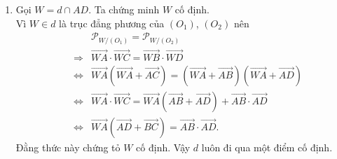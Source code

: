 \begin{bt}
{\begin{enumerate}
			Dễ thấy $P_1Q_1\parallel P_2Q_2$, do đó $\overrightarrow{P_1Q_1}=k\overrightarrow{P_2Q_2}$, $k\neq 0$. Mặt khác
			$$2\overrightarrow{XY}=\left(\overrightarrow{XP_2}+\overrightarrow{P_2Q_2}+\overrightarrow{Q_2Y}\right)+\left(\overrightarrow{XQ_1}+\overrightarrow{Q_1P_1}+\overrightarrow{P_1Y}\right)=\overrightarrow{P_2Q_2}-\overrightarrow{P_1Q_1}=(1-k)\overrightarrow{P_2Q_2}.$$
			Suy ra, $\overrightarrow{XY}\parallel\overrightarrow{P_2Q_2}$. Nhưng $JY$ là đường trung bình của $\triangle Q_1Q_2P_2$ nên $\overrightarrow{JY}\parallel \overrightarrow{P_2Q_2}$. Suy ra $\overrightarrow{JY}\parallel\overrightarrow{XY}$, do đó $X$, $Y$, $J$ thẳng hàng. Tương tự $X$, $Y$, $I$ thẳng hàng.\\
			Vậy $X$, $Y$, $I$, $J$ cùng thuộc trục đẳng phương là đường thẳng $MN$ của $(O_1)$, $(O_2)$.
			\item Gọi $W= d\cap AD$. Ta chứng minh $W$ cố định.\\
			Vì $W\in d$ là trục đẳng phương của $(O_1)$, $(O_2)$ nên 
			\begin{eqnarray*}
				&& \mathscr{P}_{W/(O_1)}=\mathscr{P}_{W/(O_2)}\\
				& \Rightarrow & \overrightarrow{WA}\cdot\overrightarrow{WC}=\overrightarrow{WB}\cdot\overrightarrow{WD}\\
				& \Leftrightarrow & \overrightarrow{WA}\left(\overrightarrow{WA}+\overrightarrow{AC}\right)=\left(\overrightarrow{WA}+\overrightarrow{AB}\right)\left(\overrightarrow{WA}+\overrightarrow{AD}\right)\\
				& \Leftrightarrow & \overrightarrow{WA}\cdot\overrightarrow{WC}=\overrightarrow{WA}\left(\overrightarrow{AB}+\overrightarrow{AD}\right)+\overrightarrow{AB}\cdot\overrightarrow{AD}\\
				& \Leftrightarrow & \overrightarrow{WA}\left(\overrightarrow{AD}+\overrightarrow{BC}\right)=\overrightarrow{AB}\cdot \overrightarrow{AD}.
			\end{eqnarray*}
			Đằng thức này chứng tỏ $W$ cố định. Vậy $d$ luôn đi qua một điểm cố định.
			
		\end{enumerate}
	}
\end{bt}
